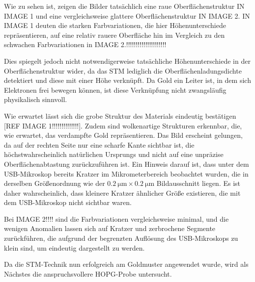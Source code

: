 Wie zu sehen ist, zeigen die Bilder tatsächlich eine raue Oberflächenstruktur IN IMAGE 1 und eine vergleichsweise glattere Oberflächenstruktur IN IMAGE 2. 
IN IMAGE 1 deuten die starken Farbvariationen, die hier Höhenunterschiede repräsentieren, auf eine relativ rauere Oberfläche hin im Vergleich zu den schwachen Farbvariationen in IMAGE 2.!!!!!!!!!!!!!!!!!!!!!


Dies spiegelt jedoch nicht notwendigerweise tatsächliche Höhenunterschiede in der Oberflächenstruktur wider, da das STM lediglich die Oberflächenladungsdichte detektiert und diese mit einer Höhe verknüpft. 
Da Gold ein Leiter ist, in dem sich Elektronen frei bewegen können, ist diese Verknüpfung nicht zwangsläufig physikalisch sinnvoll.

Wie erwartet lässt sich die grobe Struktur des Materials eindeutig bestätigen [REF IMAGE 1!!!!!!!!!!!!!!]. 
Zudem sind wolkenartige Strukturen erkennbar, die, wie erwartet, das verdampfte Gold repräsentieren. 
Das Bild erscheint gelungen, da auf der rechten Seite nur eine scharfe Kante sichtbar ist, die höchstwahrscheinlich natürlichen Ursprungs und nicht auf eine unpräzise Oberflächenabtastung zurückzuführen ist. 
Ein Hinweis darauf ist, dass unter dem USB-Mikroskop bereits Kratzer im Mikrometerbereich beobachtet wurden, die in derselben Größenordnung wie der $\SI{0.2}{\micro\metre} \times \SI{0.2}{\micro\metre}$ Bildausschnitt liegen. 
Es ist daher wahrscheinlich, dass kleinere Kratzer ähnlicher Größe existieren, die mit dem USB-Mikroskop nicht sichtbar waren.


Bei IMAGE 2!!!! sind die Farbvariationen vergleichsweise minimal, und die wenigen Anomalien lassen sich auf Kratzer und zerbrochene Segmente zurückführen, die aufgrund der begrenzten Auflösung des USB-Mikroskops zu klein sind, um eindeutig dargestellt zu werden.


Da die STM-Technik nun erfolgreich am Goldmuster angewendet wurde, wird als Nächstes die anspruchsvollere HOPG-Probe untersucht.
